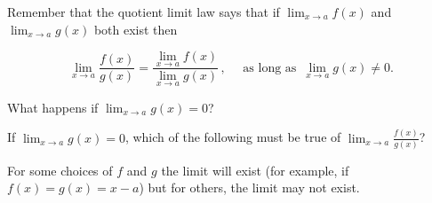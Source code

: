 \documentclass{ximera}
\author{Bobby Ramsey}
\begin{document}
Remember that the quotient limit law says that if $\displaystyle \lim_{x\to a} f(x)$ and $\displaystyle \lim_{x\to a} g(x)$ both exist then
	
\[ \lim_{x\to a} \frac{f(x)}{g(x)} = \frac{\lim_{x\to a} f(x)}{\lim_{x\to a}g(x)} \, , \quad \text{ as long as } \, \lim_{x\to a} g(x) \neq 0. \]
	
What happens if $\displaystyle \lim_{x\to a} g(x) = 0$?\\

\begin{exercise}	
	If $\displaystyle \lim_{x\to a} g(x) = 0$, which of the following must be true of $\displaystyle \lim_{x\to a} \frac{f(x)}{g(x)}$?
	\begin{multipleChoice}
	\end{multipleChoice}
	\begin{feedback}
		For some choices of $f$ and $g$ the limit will exist (for example, if 
		$f(x) = g(x) = x-a$) but for others, the limit may not exist.
	\end{feedback}	
\end{exercise}
\end{document}
